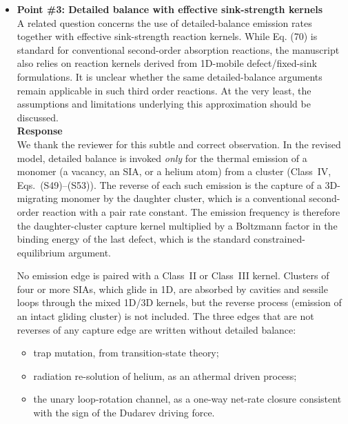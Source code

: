 \documentclass{article}
\newif\ifshowauthornotes
\newcommand{\authornote}[1]{\ifshowauthornotes{\color{red}\ [\textbf{Author action:} #1]}\fi}
\begin{document}
\begin{itemize}
\authornote{Two consistency checks before resubmission: (1) Section~3.1 still says that a gliding SIA cluster enters the binary (Class~I) kernels ``through its three-dimensionally equivalent frequency, one third of its glide frequency,'' while S3 (after Eq.~(S26)) argues this is wrong for sink strengths. Make explicit that $\omega^{\rm eff}$ is used only together with the correlation factor (Eqs.~(S34), (S68)), or state the limitation for the remaining binary SIA--SIA and V--I channels with $n\le i_{\rm mobile}$. (2) The Class~III magnitude estimate in Section~3.1 compares with a network of $10^{14}$~m$^{-2}$, whereas Tables~S3 and S9 use $\rho_{\rm net}=5\times10^{14}$~m$^{-2}$; harmonize.}

\item \textbf{Point \#3: Detailed balance with effective sink-strength kernels}\\
A related question concerns the use of detailed-balance emission rates together with effective sink-strength reaction kernels. While Eq. (70) is standard for conventional second-order absorption reactions, the manuscript also relies on reaction kernels derived from 1D-mobile defect/fixed-sink formulations. It is unclear whether the same detailed-balance arguments remain applicable in such third order reactions. At the very least, the assumptions and limitations underlying this approximation should be discussed.\\

\textbf{Response}\\
We thank the reviewer for this subtle and correct observation. In the revised model, detailed balance is invoked \emph{only} for the thermal emission of a monomer (a vacancy, an SIA, or a helium atom) from a cluster (Class~IV, Eqs.~(S49)--(S53)). The reverse of each such emission is the capture of a 3D-migrating monomer by the daughter cluster, which is a conventional second-order reaction with a pair rate constant. The emission frequency is therefore the daughter-cluster capture kernel multiplied by a Boltzmann factor in the binding energy of the last defect, which is the standard constrained-equilibrium argument.

No emission edge is paired with a Class~II or Class~III kernel. Clusters of four or more SIAs, which glide in 1D, are absorbed by cavities and sessile loops through the mixed 1D/3D kernels, but the reverse process (emission of an intact gliding cluster) is not included. The three edges that are not reverses of any capture edge are written without detailed balance:
\begin{itemize}
    \item trap mutation, from transition-state theory;
    \item radiation re-solution of helium, as an athermal driven process;
    \item the unary loop-rotation channel, as a one-way net-rate closure consistent with the sign of the Dudarev driving force.
\end{itemize}


\end{itemize}
\end{document}
